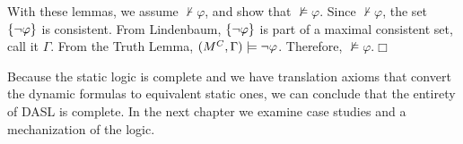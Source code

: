 With these lemmas, we assume $\not\vdash\varphi$, and show that $\not\models\varphi$. Since $\not\vdash\varphi$, the set $\{{\neg}\varphi\}$ is consistent. From Lindenbaum, $\{{\neg}\varphi\}$ is part of a maximal consistent set, call it $\Gamma$. From the Truth Lemma, $(M^C,\Gamma)\models{\neg}\varphi$. Therefore, $\not\models\varphi$.$\Box$

Because the static logic is complete and we have translation axioms that convert the dynamic formulas to equivalent static ones, we can conclude that the entirety of DASL is complete. In the next chapter we examine case studies and a mechanization of the logic.
%



